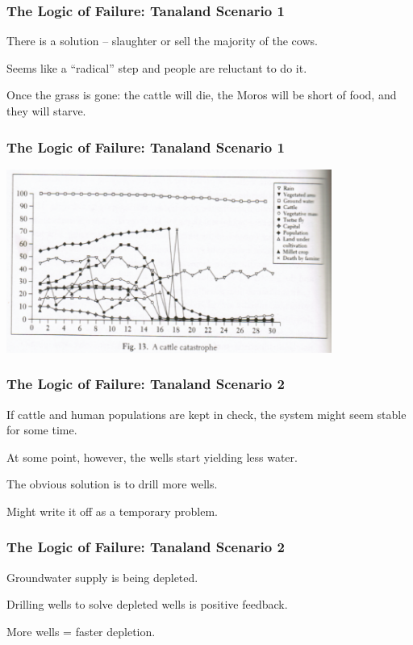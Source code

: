 \begin{frame}
\frametitle{The Logic of Failure: Tanaland Scenario 1}
\begin{changemargin}{1cm}

There is a solution  -- slaughter or sell the majority of the cows.
 
Seems like a ``radical'' step and people are reluctant to do it. 
 
Once the grass is gone: the cattle will die, the Moros will be short of food, and they will starve.

\end{changemargin}
\end{frame}


\begin{frame}
\frametitle{The Logic of Failure: Tanaland Scenario 1}
\begin{center}
	\includegraphics[width=0.8\textwidth]{images/cattlecatastrophe.png}
\end{center}
\end{frame}


\begin{frame}
\frametitle{The Logic of Failure: Tanaland Scenario 2}
\begin{changemargin}{1cm}

If cattle and human populations are kept in check, the system might seem stable for some time.

At some point, however, the wells start yielding less water.

 The obvious solution is to drill more wells.
 
 Might write it off as a temporary problem.
 
\end{changemargin}
\end{frame}

\begin{frame}
\frametitle{The Logic of Failure: Tanaland Scenario 2}
\begin{changemargin}{1cm}
Groundwater supply is being depleted.

Drilling wells to solve depleted wells is positive feedback.

More wells = faster depletion.


\end{changemargin}
\end{frame}

